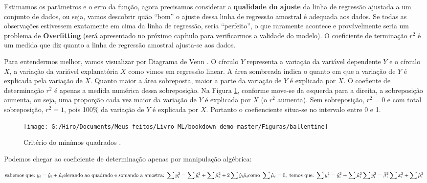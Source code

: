 \documentclass[
]{book}
\begin{document}
Estimamos os parâmetros e o erro da função, agora precisamos considerar a \textbf{qualidade do ajuste} da linha de regressão ajustada a um conjunto de dados, ou seja, vamos descobrir quão ``bom'' o ajuste dessa linha de regressão
amostral é adequada aos dados. Se todas as observações estivessem exatamente em cima da linha de regressão, seria ``perfeito'', o que raramente acontece e provávelmente seria um problema de \textbf{Overfitting} (será apresentado no próximo capítulo para verificarmos a validade do modelo). O coeficiente de terminação \(r^2\) é um medida que diz quanto a linha de regressão
amostral ajusta-se aos dados.

Para entendermos melhor, vamos visualizar por Diagrama de Venn \citep{kennedy1981ballentine}. O círculo \(Y\) representa a variação da variável dependente \(Y\) e o círculo \(X\), a variação da variável explanatória \(X\) como vimos em regressão linear. A área sombreada indica o quanto em que a variação de \(Y\) é explicada pela variação de \(X\). Quanto maior a área sobreposta, maior a parte da variação de \(Y\) é explicada por \(X\). O coefiente de determinação \(r^2\) é apenas a medida numérica dessa sobreposição. Na Figura \ref{fig:ballentine}, conforme move-se da esquerda para a direita, a sobreposição aumenta, ou seja, uma proporção cada vez maior da variação de \(Y\)
é explicada por \(X\) (o \(r^2\) aumenta). Sem sobreposição, \(r^2=0\) e com total sobreposição, \(r^2=1\), pois 100\% da variação de \(Y\) é explicada por \(X\). Portanto o coefienciente situa-se no intervalo entre 0 e 1.

\begin{figure}

{\centering \texttt{[image: G:/Hiro/Documents/Meus feitos/Livro ML/bookdown-demo-master/Figuras/ballentine]} 

}

\caption{Critério do minímos quadrados \citet{gujarati2011econometria}.}\label{fig:ballentine}
\end{figure}



Podemos chegar ao coeficiente de determinação apenas por manipulação algébrica:

\[\mbox{sabemos que:} \ y_i=\hat{y}_i+\hat{\mu}_i \\
\mbox{elevando ao quadrado e somando a amostra:} \ \sum y^2_i=\sum \hat{y}^2_i+\sum \hat{\mu}^2_i+2\sum \hat{y}_i \hat{\mu}_i \\
\mbox{como} \ \sum \hat{\mu}_i=0, \ \mbox{temos que:}\ \sum y^2_i= \hat{y}^2_i+\sum \hat{\mu}^2_i \\ \sum y^2_i=\hat{\beta}^2_1 \sum x_i^2+\sum \hat{\mu}^2_i \]
\end{document}
